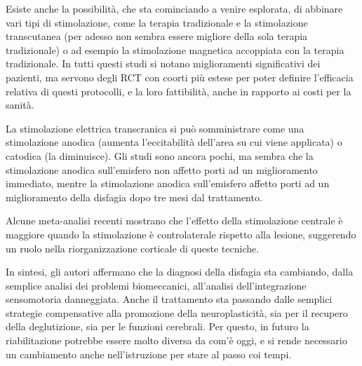 Esiste anche la possibilità, che sta cominciando a venire esplorata, di 
abbinare vari tipi di stimolazione, come la terapia tradizionale e la 
stimolazione transcutanea (per adesso non sembra essere migliore della sola 
terapia tradizionale) o ad esempio la stimolazione magnetica accoppiata con la 
terapia tradizionale.
In tutti questi studi si notano miglioramenti significativi dei pazienti, ma 
servono degli RCT con coorti più estese per poter definire l'efficacia relativa 
di questi protocolli, e la loro fattibilità, anche in rapporto ai costi per la 
sanità.

La stimolazione elettrica transcranica si può somministrare come una 
stimolazione anodica (aumenta l'eccitabilità dell'area su cui viene applicata) 
o catodica (la diminuisce).
Gli studi sono ancora pochi, ma sembra che la stimolazione anodica 
sull'emisfero non affetto porti ad un miglioramento immediato, mentre la 
stimolazione anodica sull'emisfero affetto porti ad un miglioramento della 
disfagia dopo tre mesi dal trattamento.

Alcune meta-analisi recenti mostrano che l'effetto della stimolazione centrale 
è maggiore quando la stimolazione è controlaterale rispetto alla lesione, 
suggerendo un ruolo nella riorganizzazione corticale di queste tecniche.

In sintesi, gli autori affermano che la diagnosi della disfagia sta cambiando, 
dalla semplice analisi dei problemi biomeccanici, all'analisi dell'integrazione 
sensomotoria danneggiata.
Anche il trattamento sta passando dalle semplici strategie compensative alla 
promozione della neuroplasticità, sia per il recupero della deglutizione, sia 
per le funzioni cerebrali.
Per questo, in futuro la riabilitazione potrebbe essere molto diversa da com'è 
oggi, e si rende necessario un cambiamento anche nell'istruzione per stare al 
passo coi tempi.